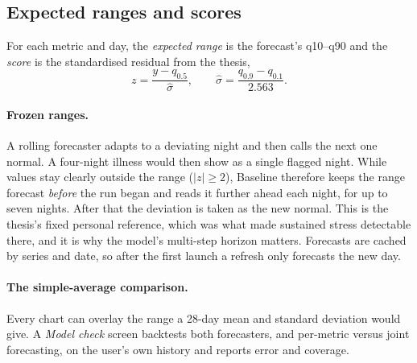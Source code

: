 \documentclass[11pt,a4paper]{article}
\begin{document}
\subsection{Expected ranges and scores}
For each metric and day, the \emph{expected range} is the forecast's q10--q90 and the \emph{score} is the standardised residual from the thesis,
\begin{equation}
  z = \frac{y - q_{0.5}}{\hat\sigma}, \qquad \hat\sigma = \frac{q_{0.9}-q_{0.1}}{2.563}.
\end{equation}

\paragraph{Frozen ranges.} A rolling forecaster adapts to a deviating night and then calls the next one normal. A four-night illness would then show as a single flagged night. While values stay clearly outside the range ($|z|\geq2$), Baseline therefore keeps the range forecast \emph{before} the run began and reads it further ahead each night, for up to seven nights. After that the deviation is taken as the new normal. This is the thesis's fixed personal reference, which was what made sustained stress detectable there, and it is why the model's multi-step horizon matters. Forecasts are cached by series and date, so after the first launch a refresh only forecasts the new day.

\paragraph{The simple-average comparison.} Every chart can overlay the range a 28-day mean and standard deviation would give. A \emph{Model check} screen backtests both forecasters, and per-metric versus joint forecasting, on the user's own history and reports error and coverage.
\end{document}
